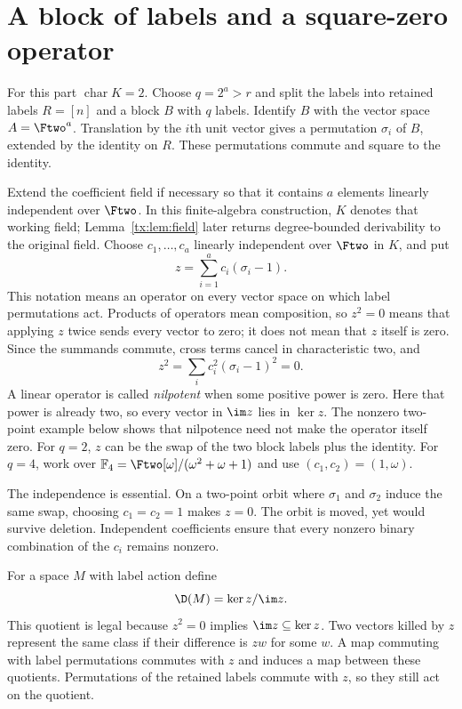 \section{A block of labels and a square-zero operator}\label{tx:sec:block2}
For this part $\operatorname{char}K=2$. Choose $q=2^a>r$ and split the labels into retained labels $R=[n]$ and a block $B$ with $q$ labels. Identify $B$ with the vector space $A=\Ftwo^a$. Translation by the $i$th unit vector gives a permutation $\sigma_i$ of $B$, extended by the identity on $R$. These permutations commute and square to the identity.

Extend the coefficient field if necessary so that it contains $a$
elements linearly independent over $\Ftwo$. In this finite-algebra
construction, $K$ denotes that working field; Lemma~\ref{tx:lem:field}
later returns degree-bounded derivability to the original field.
Choose $c_1,\ldots,c_a$ linearly independent over $\Ftwo$ in $K$, and put
\begin{equation}\label{tx:eq:z2}z=\sum_{i=1}^ac_i(\sigma_i-1).\end{equation}
This notation means an operator on every vector space on which label permutations act. Products of operators mean composition, so $z^2=0$ means that applying $z$ twice sends every vector to zero; it does not mean that $z$ itself is zero. Since the summands commute, cross terms cancel in characteristic two, and
\[z^2=\sum_i c_i^2(\sigma_i-1)^2=0.\]
A linear operator is called \emph{nilpotent} when some positive
power is zero. Here that power is already two, so every vector
in $\im z$ lies in $\ker z$. The nonzero two-point example below
shows that nilpotence need not make the operator itself zero.
For $q=2$, $z$ can be the swap of the two block labels plus the identity. For $q=4$, work over $\mathbb F_4=\Ftwo[\omega]/(\omega^2+\omega+1)$ and use $(c_1,c_2)=(1,\omega)$.

The independence is essential. On a two-point orbit where $\sigma_1$ and $\sigma_2$ induce the same swap, choosing $c_1=c_2=1$ makes $z=0$. The orbit is moved, yet would survive deletion. Independent coefficients ensure that every nonzero binary combination of the $c_i$ remains nonzero.

For a space $M$ with label action define
\begin{equation}\label{tx:eq:D2}\D(M)=\ker z/\im z.\end{equation}
This quotient is legal because $z^2=0$ implies $\im z\subseteq\ker z$. Two vectors killed by $z$ represent the same class if their difference is $zw$ for some $w$. A map commuting with label permutations commutes with $z$ and induces a map between these quotients. Permutations of the retained labels commute with $z$, so they still act on the quotient.

